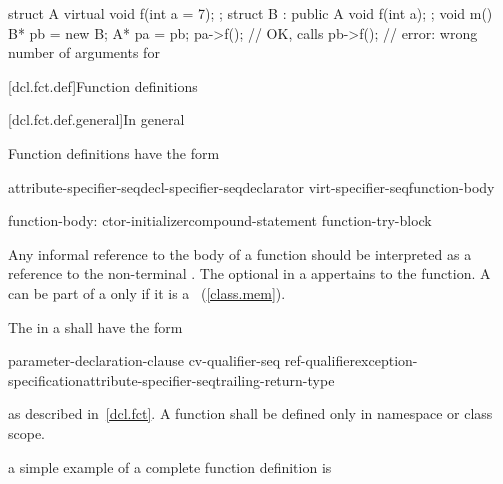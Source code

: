 \begin{codeblock}
struct A {
  virtual void f(int a = 7);
};
struct B : public A {
  void f(int a);
};
void m() {
  B* pb = new B;
  A* pa = pb;
  pa->f();          // OK, calls 
  pb->f();          // error: wrong number of arguments for 
}
\end{codeblock}
\exitexample%
%

[dcl.fct.def]{Function definitions}%

[dcl.fct.def.general]{In general}

\pnum
{}%
Function definitions have the form

%
%
\begin{bnf}
\br
    attribute-specifier-seq\opt decl-specifier-seq\opt declarator virt-specifier-seq\opt function-body
\end{bnf}

\begin{bnf}
function-body:\br
    ctor-initializer\opt compound-statement\br
    function-try-block\br
    \br
    \br
\end{bnf}

Any informal reference to the body of a function should be interpreted as a reference to
the non-terminal .
The optional  in a 
appertains to the function.
A  can be part of a 
only if it is a ~(\ref{class.mem}).

\pnum
The
in a
shall have the form

\begin{ncsimplebnf}
 parameter-declaration-clause \terminal{)} cv-qualifier-seq\opt\br   
    \hspace*{\bnfindentinc}ref-qualifier\opt exception-specification\opt attribute-specifier-seq\opt trailing-return-type\opt
\end{ncsimplebnf}

as described in~\ref{dcl.fct}.
A function shall be defined only in namespace or class scope.

\pnum
\enterexample
a simple example of a complete function definition is

